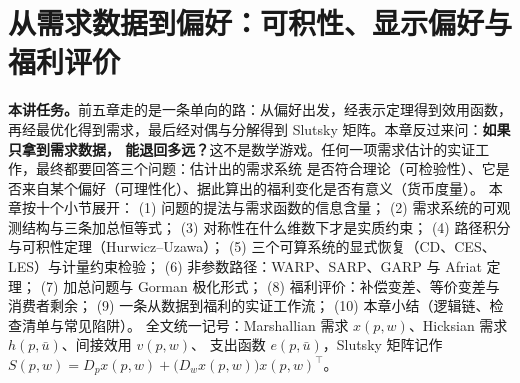 

\chapter{从需求数据到偏好：可积性、显示偏好与福利评价}
\noindent\textbf{本讲任务。}前五章走的是一条单向的路：从偏好出发，经表示定理得到效用函数，
再经最优化得到需求，最后经对偶与分解得到 Slutsky 矩阵。本章反过来问：\textbf{如果只拿到需求数据，
能退回多远？}这不是数学游戏。任何一项需求估计的实证工作，最终都要回答三个问题：估计出的需求系统
是否符合理论（可检验性）、它是否来自某个偏好（可理性化）、据此算出的福利变化是否有意义（货币度量）。
本章按十个小节展开：
(1) 问题的提法与需求函数的信息含量；
(2) 需求系统的可观测结构与三条加总恒等式；
(3) 对称性在什么维数下才是实质约束；
(4) 路径积分与可积性定理（Hurwicz--Uzawa）；
(5) 三个可算系统的显式恢复（CD、CES、LES）与计量约束检验；
(6) 非参数路径：WARP、SARP、GARP 与 Afriat 定理；
(7) 加总问题与 Gorman 极化形式；
(8) 福利评价：补偿变差、等价变差与消费者剩余；
(9) 一条从数据到福利的实证工作流；
(10) 本章小结（逻辑链、检查清单与常见陷阱）。
全文统一记号：Marshallian 需求 $x(p,w)$、Hicksian 需求 $h(p,\bar u)$、间接效用 $v(p,w)$、
支出函数 $e(p,\bar u)$，Slutsky 矩阵记作 $S(p,w)=D_px(p,w)+\bigl(D_wx(p,w)\bigr)x(p,w)^{\!\top}$。
\tableofcontents
\clearpage











